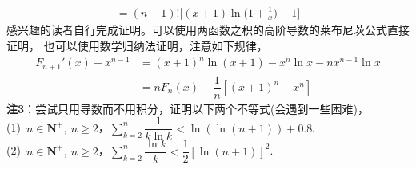 \begin{enumerate}[label={【\textbf{例\thechapter.\arabic*}】},
 leftmargin=\inteval{\myenumleftmargin}pt,
 itemsep=\inteval{\myenumitempsep}pt,
 itemindent=\inteval{\myenumitemindent}pt]
\begin{gather*}
    =(n-1)!\Big[(x+1)\ln\Big(1+\frac{1}{x}\Big)-1\Big]
\end{gather*}
感兴趣的读者自行完成证明。可以使用两函数之积的高阶导数的莱布尼茨公式直接证明，
也可以使用数学归纳法证明，注意如下规律，
\begin{align*}
    F_{n+1}'(x)+x^{n-1} & =(x+1)^n\ln(x+1)-x^n\ln x-nx^{n-1}\ln x\\
    & =nF_n(x)+\dfrac{1}{n}[(x+1)^n-x^n]
\end{align*}
\textbf{注3}：尝试只用导数而不用积分，证明以下两个不等式(会遇到一些困难)，\\
(1)\ $ n\in \textbf{N}^+,\ n\geq 2 $，$ \sum\limits_{k=2}^{n}
\dfrac{1}{k\ln k}<\ln(\ln (n+1))+0.8 $.\\ 
(2)\ $ n\in \textbf{N}^+,\ n\geq 2 $，$ \sum\limits_{k=2}^{n}
\dfrac{\ln k}{k}<\dfrac{1}{2}[\ln(n+1)]^2 $.


\end{enumerate}

